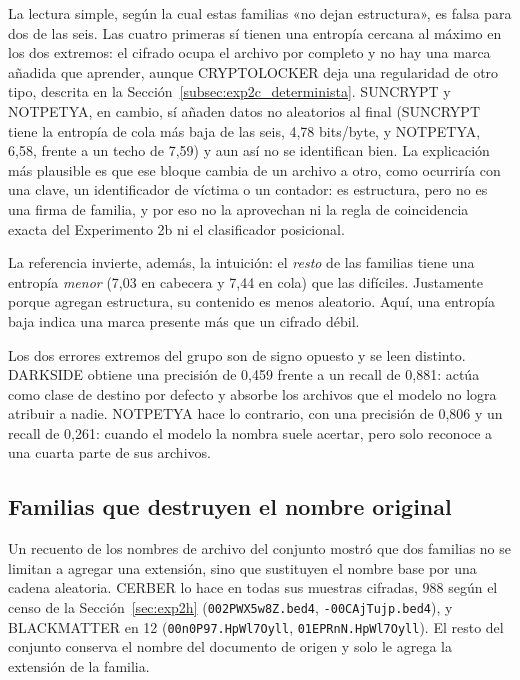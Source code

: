 La lectura simple, según la cual estas familias «no dejan estructura», es falsa para dos de las seis. Las cuatro primeras sí tienen una entropía cercana al máximo en los dos extremos: el cifrado ocupa el archivo por completo y no hay una marca añadida que aprender, aunque CRYPTOLOCKER deja una regularidad de otro tipo, descrita en la Sección~\ref{subsec:exp2c_determinista}. SUNCRYPT y NOTPETYA, en cambio, sí añaden datos no aleatorios al final (SUNCRYPT tiene la entropía de cola más baja de las seis, 4,78 bits/byte, y NOTPETYA, 6,58, frente a un techo de 7,59) y aun así no se identifican bien. La explicación más plausible es que ese bloque cambia de un archivo a otro, como ocurriría con una clave, un identificador de víctima o un contador: es estructura, pero no es una firma de familia, y por eso no la aprovechan ni la regla de coincidencia exacta del Experimento 2b ni el clasificador posicional.

La referencia invierte, además, la intuición: el \textit{resto} de las familias tiene una entropía \textit{menor} (7,03 en cabecera y 7,44 en cola) que las difíciles. Justamente porque agregan estructura, su contenido es menos aleatorio. Aquí, una entropía baja indica una marca presente más que un cifrado débil.

Los dos errores extremos del grupo son de signo opuesto y se leen distinto. DARKSIDE obtiene una precisión de 0,459 frente a un recall de 0,881: actúa como clase de destino por defecto y absorbe los archivos que el modelo no logra atribuir a nadie. NOTPETYA hace lo contrario, con una precisión de 0,806 y un recall de 0,261: cuando el modelo la nombra suele acertar, pero solo reconoce a una cuarta parte de sus archivos.

\subsection{Familias que destruyen el nombre original}
\label{subsec:exp2c_renombrado}

Un recuento de los nombres de archivo del conjunto mostró que dos familias no se limitan a agregar una extensión, sino que sustituyen el nombre base por una cadena aleatoria. CERBER lo hace en todas sus muestras cifradas, 988 según el censo de la Sección~\ref{sec:exp2h} (\texttt{002PWX5w8Z.bed4}, \texttt{-00CAjTujp.bed4}), y BLACKMATTER en 12 (\texttt{00n0P97.HpWl7Oyll}, \texttt{01EPRnN.HpWl7Oyll}). El resto del conjunto conserva el nombre del documento de origen y solo le agrega la extensión de la familia.

